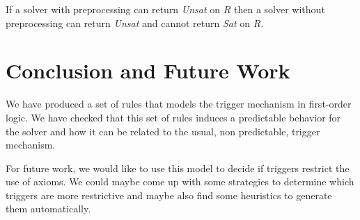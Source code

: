 \documentclass[a4paper,11pt]{article}
\begin{document}
{\theorem If a solver with preprocessing can return \emph{Unsat} on $R$ then
a solver without preprocessing can return \emph{Unsat} and cannot return \emph{Sat} on $R$.}

\section{Conclusion and Future Work}
We have produced a set of rules that models the trigger mechanism in first-order logic. We have checked
that this set of rules induces a predictable behavior for the solver and how it can be related
to the usual, non predictable, trigger mechanism.

For future work, we would like to use this model to decide if triggers restrict the use of axioms.
We could maybe come up with some strategies to determine which triggers are more restrictive and
maybe also find some heuristics to generate them automatically.
\end{document}
